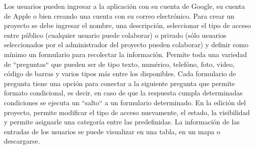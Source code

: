Los usuarios pueden ingresar a la aplicación con su cuenta de Google, su cuenta de Apple o bien creando una cuenta con su correo electrónico. Para crear un proyecto se debe ingresar el nombre, una descripción, seleccionar el tipo de acceso entre público (cualquier usuario puede colaborar) o privado (sólo usuarios seleccionados por el administrador del proyecto pueden colaborar) y definir como mínimo un formulario para recolectar la información. Permite toda una variedad de ``preguntas“ que pueden ser de tipo texto, numérico, telefóno, foto, video, código de barras y varios tipos más entre los disponibles. Cada formulario de pregunta tiene una opción para conectar a la siguiente pregunta que permite formato condicional, es decir, en caso de que la respuesta cumpla determinadas condiciones se ejecuta un ``salto“ a un formulario determinado. En la edición del proyecto, permite modificar el tipo de acceso nuevamente, el estado, la visibilidad y permite asignarle una categoría entre las predefinidas.
La información de las entradas de los usuarios se puede visualizar en una tabla, en un mapa o descargarse.

